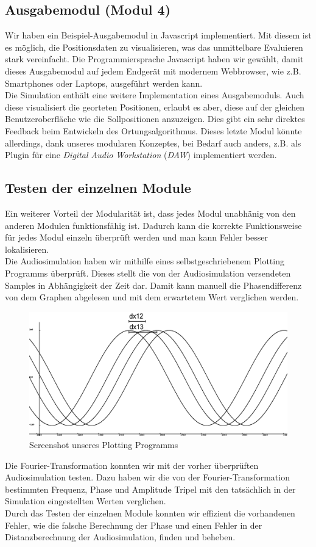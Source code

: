   \subsection{Ausgabemodul (Modul 4)}
  Wir haben ein Beispiel-Ausgabemodul in Javascript implementiert. Mit diesem ist es möglich, die Positionsdaten zu visualisieren, was das unmittelbare Evaluieren stark vereinfacht. Die Programmiersprache Javascript haben wir gewählt, damit dieses Ausgabemodul auf jedem Endgerät mit modernem Webbrowser, wie z.B. Smartphones oder Laptops, ausgeführt werden kann.\\
  Die Simulation enthält eine weitere Implementation eines Ausgabemoduls. Auch diese visualisiert die georteten Positionen, erlaubt es aber, diese auf der gleichen Benutzeroberfläche wie die Sollpositionen anzuzeigen. Dies gibt ein sehr direktes Feedback beim Entwickeln des Ortungsalgorithmus. Dieses letzte Modul könnte allerdings, dank unseres modularen Konzeptes, bei Bedarf auch anders, z.B. als Plugin für eine \textit{Digital Audio Workstation} (\textit{DAW}) implementiert werden. 
  \subsection{Testen der einzelnen Module}
  Ein weiterer Vorteil der Modularität ist, dass jedes Modul unabhänig von den anderen Modulen funktionsfähig ist. Dadurch kann die korrekte Funktionsweise für jedes Modul einzeln überprüft werden und man kann Fehler besser lokalisieren. \\
  Die Audiosimulation haben wir mithilfe eines selbstgeschriebenem Plotting Programms überprüft. Dieses stellt die von der Audiosimulation versendeten Samples in Abhängigkeit der Zeit dar. Damit kann manuell die Phasendifferenz von dem Graphen abgelesen und mit dem erwartetem Wert verglichen werden.
  \begin{figure} [H]
    \includegraphics[width=\linewidth]{img/glplot}
    \caption{Screenshot unseres Plotting Programms}
    \label{fig:glplot}
  \end{figure}

  Die Fourier-Transformation konnten wir mit der vorher überprüften Audiosimulation testen. Dazu haben wir die von der Fourier-Transformation bestimmten Frequenz, Phase und Amplitude Tripel mit den tatsächlich in der Simulation eingestellten Werten verglichen.\\
  Durch das Testen der einzelnen Module konnten wir effizient die vorhandenen Fehler, wie die falsche Berechnung der Phase und einen Fehler in der Distanzberechnung der Audiosimulation, finden und beheben.
